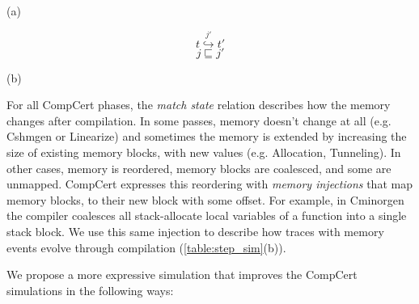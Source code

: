 \begin{table}\centering
\begin{multicols}{2}

\



\

(a)
\begin{multicols}{2}

$$t \overset{j'}{\hookrightarrow} t'$$
$$j \sqsubseteq j'$$
\end{multicols}

(b)
\end{multicols}
\caption{Step simulation step diagrams. (a) if $s_1$ takes a step to $s_2$ with trace $t$ and $s_1$ is related to some $s_2$, then there $s_2$ can take a number of steps with trace $t$ to a new state $2_2'$ related to $s_1'$. (b) The new diagram exposes the memory reordering injections $j$ and $j'$ and the traces $t$ and $t'$ are equivalent up to injection, by . }\label{table:step_sim}
\end{table}
For all CompCert phases, the \emph{match state} relation describes how the memory changes after compilation. In some passes, memory doesn't change at all (e.g. Cshmgen or Linearize) and sometimes the memory is extended by increasing the size of existing memory blocks, with new values (e.g. Allocation, Tunneling). In other cases, memory is reordered, memory blocks are coalesced, and some are unmapped. CompCert expresses this reordering with \emph{memory injections} that map memory blocks, to their new block with some offset. For example, in Cminorgen the compiler coalesces all stack-allocate local variables of a function into a single stack block. We use this same injection to describe how traces with memory events evolve through compilation (\autoref{table:step_sim}(b)).

We propose a more expressive simulation  that improves the CompCert simulations in the following ways:

